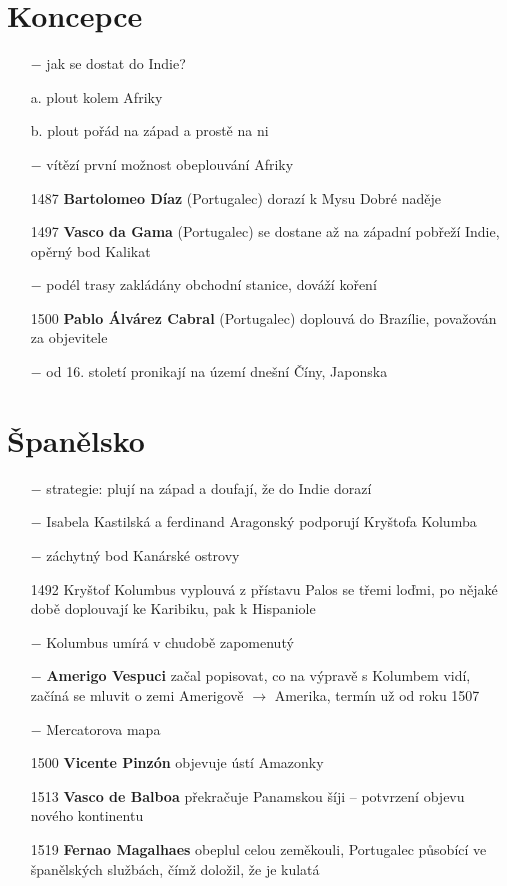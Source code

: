 \documentclass{article}
\begin{document}
\section*{Koncepce}
\begin{itemize}
    \vspace{-0.5em}
    \setlength\itemsep{0.15em}
    \item[$-$] jak se dostat do Indie?
    \item[a.] plout kolem Afriky
    \item[b.] plout pořád na západ a prostě na ni 
    \item[$-$] vítězí první možnost obeplouvání Afriky
    \item[1487] \textbf{Bartolomeo Díaz} (Portugalec) dorazí k Mysu Dobré naděje
    \item[1497] \textbf{Vasco da Gama} (Portugalec) se dostane až na západní pobřeží Indie, opěrný bod Kalikat
    \item[$-$] podél trasy zakládány obchodní stanice, dováží koření
    \item[1500] \textbf{Pablo Álvárez Cabral} (Portugalec) doplouvá do Brazílie, považován za objevitele
    \item[$-$] od 16. století pronikají na území dnešní Číny, Japonska
\end{itemize}

\section*{Španělsko}
\begin{itemize}
    \vspace{-0.5em}
    \setlength\itemsep{0.15em}
    \item[$-$] strategie: plují na západ a doufají, že do Indie dorazí
    \item[$-$] Isabela Kastilská a ferdinand Aragonský podporují Kryštofa Kolumba
    \item[$-$] záchytný bod Kanárské ostrovy
    \item[1492] Kryštof Kolumbus vyplouvá z přístavu Palos se třemi loďmi, po nějaké době doplouvají ke Karibiku, pak k Hispaniole
    \item[$-$] Kolumbus umírá v chudobě zapomenutý
    \item[$-$] \textbf{Amerigo Vespuci} začal popisovat, co na výpravě s Kolumbem vidí, začíná se mluvit o zemi Amerigově $\rightarrow$ Amerika, termín už od roku 1507
    \item[$-$] Mercatorova mapa
    \item[1500] \textbf{Vicente Pinzón} objevuje ústí Amazonky
    \item[1513] \textbf{Vasco de Balboa} překračuje Panamskou šíji -- potvrzení objevu nového kontinentu
    \item[1519] \textbf{Fernao Magalhaes} obeplul celou zeměkouli, Portugalec působící ve španělských službách, čímž doložil, že je kulatá
\end{itemize}
\end{document}
